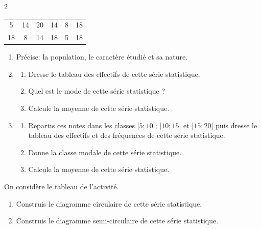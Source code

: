 \begin{multicols*}{2}
 	\begin{tabular}{cccccc}
 		\hline
 		5 & 14 & 20 & 14 & 8& 18 \\
 		18 & 8 & 14 & 18 & 5 & 18 \\
 		\hline
 	\end{tabular}
 	\begin{enumerate}
 		\item Précise: la population, le caractère étudié et sa nature.
 		\item 
 		\begin{enumerate}
 			\item Dresse le tableau des effectifs de cette série statistique.
 			\item Quel est le mode de cette série statistique ? 
 			\item Calcule la moyenne de cette série statistique.	
 		\end{enumerate}
 		\item 
 		\begin{enumerate}
 			\item Repartis ces notes dans les classes $[5;10[$; $[10;15[$ et $[15;20[$ puis dresse le tableau des effectifs et des fréquences de cette série statistique.
 			\item  Donne la classe modale de cette série statistique.
 			\item Calcule la moyenne de cette série statistique.
 		\end{enumerate}
 	\end{enumerate}
 	\newpage
 	\dures
 	 
 	On considère le tableau de l'activité.
 	\begin{enumerate}
 		\item Construis le diagramme circulaire de cette série statistique.
 		\item Construis le diagramme semi-circulaire de cette série statistique.
 	\end{enumerate}
 	\dures
 	
\end{multicols*}
